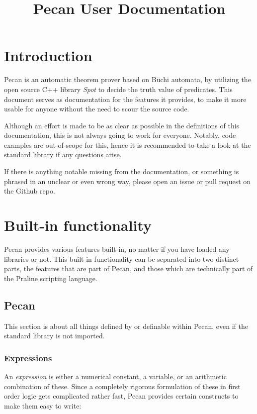 \documentclass{report}
\title{Pecan User Documentation}
\date{}
\begin{document}
\maketitle{}

\tableofcontents

\chapter{Introduction}
Pecan is an automatic theorem prover based on Büchi automata, by utilizing the open source C++ library \emph{Spot} to decide the truth value of predicates.
This document serves as documentation for the features it provides, to make it more usable for anyone without the need to scour the source code.

Although an effort is made to be as clear as possible in the definitions of this documentation, this is not always going to work for everyone.
Notably, code examples are out-of-scope for this, hence it is recommended to take a look at the standard library if any questions arise.

If there is anything notable missing from the documentation, or something is phrased in an unclear or even wrong way, please open an issue or pull request on the Github repo.


\chapter{Built-in functionality}
Pecan provides various features built-in, no matter if you have loaded any libraries or not.
This built-in functionality can be separated into two distinct parts, the features that are part of Pecan, and those which are technically part of the Praline scripting language.

\section{Pecan}
This section is about all things defined by or definable within Pecan, even if the standard library is not imported.


\subsection{Expressions}
An \emph{expression} is either a numerical constant, a variable, or an arithmetic combination of these.
Since a completely rigorous formulation of these in first order logic gets complicated rather fast, Pecan provides certain constructs to make them easy to write:
\end{document}
